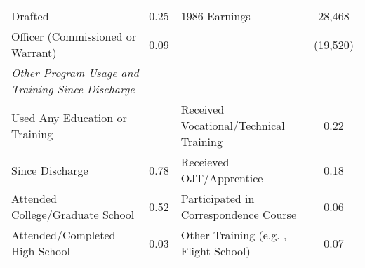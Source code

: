 \documentclass{article}
\begin{document}
\begin{table}[]
\begin{tabular}{lcclcc}
\multicolumn{2}{l}{Drafted}                                                      & 0.25     & \multicolumn{2}{l}{1986 Earnings}                                                                                                                                      & 28,468                                                              \\
\multicolumn{2}{l}{Officer (Commissioned or Warrant)}                            & 0.09     & \multicolumn{2}{l}{}                                                                                                                                                   & (19,520)                                                            \\
\multicolumn{3}{l}{\textit{Other Program Usage and Training Since Discharge}}               & \multicolumn{3}{l}{}                                                                                                                                                                                                                         \\
\multicolumn{2}{l}{Used Any Education or Training}                               &          & \multicolumn{2}{l}{Received Vocational/Technical Training}                                                                                                             & 0.22                                                                \\
\multicolumn{2}{l}{Since Discharge}                                              & 0.78     & \multicolumn{2}{l}{Receieved OJT/Apprentice}                                                                                                                           & 0.18                                                                \\
\multicolumn{2}{l}{Attended College/Graduate School}                             & 0.52     & \multicolumn{2}{l}{Participated in Correspondence Course}                                                                                                              & 0.06                                                                \\
\multicolumn{2}{l}{Attended/Completed High School}                               & 0.03     & \multicolumn{2}{l}{Other Training (e.g. , Flight School)}                                                                                                              & 0.07                                                                \\

\end{tabular}
\end{table}
\end{document}
